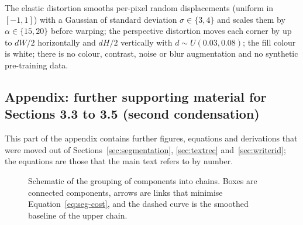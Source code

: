 The elastic distortion smooths per-pixel random displacements (uniform in $[-1,1]$) with a Gaussian of standard deviation $\sigma\in\{3,4\}$ and scales them by $\alpha\in\{15,20\}$ before warping; the perspective distortion moves each corner by up to $dW/2$ horizontally and $dH/2$ vertically with $d\sim U(0.03,0.08)$; the fill colour is white; there is no colour, contrast, noise or blur augmentation and no synthetic pre-training data.

\subsection{Appendix: further supporting material for Sections 3.3 to 3.5 (second condensation)}

This part of the appendix contains further figures, equations and derivations that were moved out of Sections~\ref{sec:segmentation}, \ref{sec:textrec} and~\ref{sec:writerid}; the equations are those that the main text refers to by number.

\begin{figure}[h]
\centering
{}
\caption{Schematic of the grouping of components into chains. Boxes are connected components, arrows are links that minimise Equation~\ref{eq:seg-cost}, and the dashed curve is the smoothed baseline of the upper chain.}
\label{fig:seg-chain}
\end{figure}

